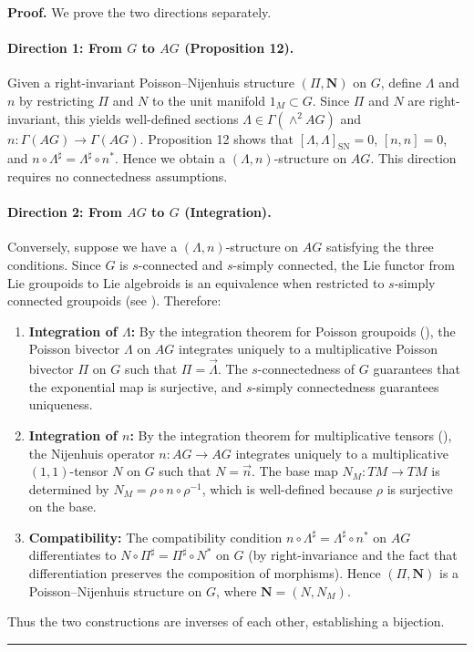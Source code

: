 \documentclass{article}
\newcommand{\SN}{\mathrm{SN}}
\newcommand{\II}{\Pi}
\newcommand{\NN}{\mathbf{N}}
\newcommand{\LL}{\Lambda}
\newenvironment{proof}[1][Proof]{\noindent\textbf{#1.} }{\ \rule{0.5em}{0.5em}}
\begin{document}
\begin{proof}
We prove the two directions separately.

\paragraph{Direction 1: From $G$ to $AG$ (Proposition 12).}
Given a right-invariant Poisson–Nijenhuis structure $(\II, \NN)$ on $G$, define $\LL$ and $n$ by restricting $\II$ and $N$ to the unit manifold $1_M \subset G$. Since $\II$ and $N$ are right-invariant, this yields well-defined sections $\LL \in \Gamma(\wedge^2 AG)$ and $n: \Gamma{(AG)} \to \Gamma{(AG)}$. Proposition 12 shows that $[\LL, \LL]_{\SN} = 0$, $[n, n] = 0$, and $n \circ \LL^{\sharp} = \LL^{\sharp} \circ n^{*}$. Hence we obtain a $(\LL, n)$-structure on $AG$. This direction requires no connectedness assumptions.

\paragraph{Direction 2: From $AG$ to $G$ (Integration).}
Conversely, suppose we have a $(\LL, n)$-structure on $AG$ satisfying the three conditions. Since $G$ is $s$-connected and $s$-simply connected, the Lie functor from Lie groupoids to Lie algebroids is an equivalence when restricted to $s$-simply connected groupoids (see \cite{Kiril0Mackenzie}). Therefore:

\begin{enumerate}
    \item \textbf{Integration of $\LL$:} By the integration theorem for Poisson groupoids (\cite{Kiril0Mackenzie}), the Poisson bivector $\LL$ on $AG$ integrates uniquely to a multiplicative Poisson bivector $\II$ on $G$ such that $\II = \overrightarrow{\LL}$. The $s$-connectedness of $G$ guarantees that the exponential map is surjective, and $s$-simply connectedness guarantees uniqueness.

    \item \textbf{Integration of $n$:} By the integration theorem for multiplicative tensors (\cite{Bursztyn}), the Nijenhuis operator $n: AG \to AG$ integrates uniquely to a multiplicative $(1,1)$-tensor $N$ on $G$ such that $N = \overrightarrow{n}$. The base map $N_M: TM \to TM$ is determined by $N_M = \rho \circ n \circ \rho^{-1}$, which is well-defined because $\rho$ is surjective on the base.

    \item \textbf{Compatibility:} The compatibility condition $n \circ \LL^{\sharp} = \LL^{\sharp} \circ n^{*}$ on $AG$ differentiates to $N \circ \II^{\sharp} = \II^{\sharp} \circ N^{*}$ on $G$ (by right-invariance and the fact that differentiation preserves the composition of morphisms). Hence $(\II, \NN)$ is a Poisson–Nijenhuis structure on $G$, where $\NN = (N, N_M)$.
\end{enumerate}

Thus the two constructions are inverses of each other, establishing a bijection.
\end{proof}
\end{document}
